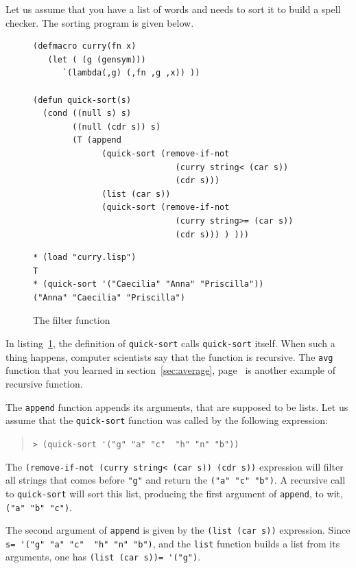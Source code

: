 \documentclass[a4paper,12pt]{book}
\newenvironment{fmpage}[1]
           {\begin{lrbox}{\fmbox}\begin{minipage}{#1}}
           {\end{minipage}\end{lrbox}\fbox{\usebox{\fmbox}}}
\begin{document}
Let us assume that you have a list
of words and needs to sort it
to build a spell checker. The sorting
program is given below.



\begin{figure}[!h]
\begin{fmpage}{\linewidth}
\begin{verbatim}
(defmacro curry(fn x)
   (let ( (g (gensym)))
      `(lambda(,g) (,fn ,g ,x)) ))

(defun quick-sort(s)
  (cond ((null s) s)
        ((null (cdr s)) s)
        (T (append 
              (quick-sort (remove-if-not 
                             (curry string< (car s)) 
                             (cdr s)))
              (list (car s))
              (quick-sort (remove-if-not
                             (curry string>= (car s))
                             (cdr s))) ) )))
\end{verbatim}
\end{fmpage}

\begin{fmpage}{\linewidth}
\begin{verbatim}
* (load "curry.lisp")
T
* (quick-sort '("Caecilia" "Anna" "Priscilla"))
("Anna" "Caecilia" "Priscilla")
\end{verbatim}
\end{fmpage}
\caption{The filter function}
\label{fig:filter}
\end{figure}

In listing~\ref{fig:filter}, the definition of
\verb|quick-sort| calls \verb|quick-sort| itself.
When such a thing happens, computer scientists
say that the function is recursive. The \verb|avg|
function that you learned in section~\ref{sec:average},
page~\pageref{sec:average} is another example of
recursive function. 

The \verb|append| function appends its
arguments, that are supposed to be lists.
Let us assume that the \verb|quick-sort|
function was called by the following expression:
\begin{quote}
\verb|> (quick-sort '("g" "a" "c"  "h" "n" "b"))|
\end{quote}
The \verb|(remove-if-not (curry string< (car s)) (cdr s))|
expression will filter all strings that comes before
\verb|"g"| and return the \verb|("a" "c" "b")|.
A recursive call to \verb|quick-sort| will
sort this list, producing the first argument
of \verb|append|, to wit, \verb|("a" "b" "c")|.

The second argument of \verb|append| is
given by the \verb|(list (car s))| expression.
Since \verb|s= '("g" "a" "c"  "h" "n" "b")|,
and the \verb|list| function builds a list
from its arguments, one
has \verb|(list (car s))= '("g")|.
\end{document}
